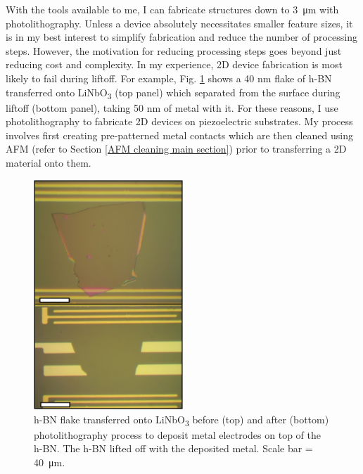 \documentclass[double,12pt,1in]{beavtex}
\begin{document}
With the tools available to me, I can fabricate structures down to \SI{3}{\micro\meter} with photolithography. Unless a device absolutely necessitates smaller feature sizes, it is in my best interest to simplify fabrication and reduce the number of processing steps. However, the motivation for reducing processing steps goes beyond just reducing cost and complexity. In my experience, 2D device fabrication is most likely to fail during liftoff. For example, Fig. \ref{fig:h-BN lifted} shows a 40 nm flake of h-BN transferred onto LiNbO\textsubscript{3} (top panel) which separated from the surface during liftoff (bottom panel), taking 50 nm of metal with it. For these reasons, I use photolithography to fabricate 2D devices on piezoelectric substrates. My process involves first creating pre-patterned metal contacts which are then cleaned using AFM (refer to Section \ref{AFM cleaning main section}) prior to transferring a 2D material onto them.
\begin{figure}
    \includegraphics[width = 0.5\textwidth]{hBN lifted off.pdf}
    \caption{h-BN flake transferred onto LiNbO\textsubscript{3} before (top) and after (bottom) photolithography process to deposit metal electrodes on top of the h-BN. The h-BN lifted off with the deposited metal. Scale bar = \SI{40}{\micro\meter}.}
    \label{fig:h-BN lifted}
\end{figure}
\end{document}
